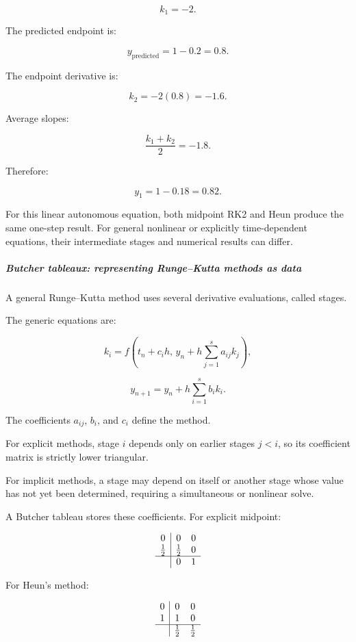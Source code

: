 \[
k_1=-2.
\]

The predicted endpoint is:

\[
y_{\mathrm{predicted}}=1-0.2=0.8.
\]

The endpoint derivative is:

\[
k_2=-2(0.8)=-1.6.
\]

Average slopes:

\[
\frac{k_1+k_2}{2}=-1.8.
\]

Therefore:

\[
y_1=1-0.18=\boxed{0.82}.
\]

For this linear autonomous equation, both midpoint RK2 and Heun produce the same one-step result. For general nonlinear or explicitly time-dependent equations, their intermediate stages and numerical results can differ.

\subparagraph{Butcher tableaux: representing Runge--Kutta methods as data}\label{02-foundations-ii-ch025-butcher-tableaux-representing-rungekutta-methods-as-data}

A general Runge--Kutta method uses several derivative evaluations, called stages.

The generic equations are:

\[
k_i= f\left( t_n+c_ih,\, y_n+h\sum_{j=1}^{s}a_{ij}k_j \right),
\]

\[
\boxed{ y_{n+1} = y_n+h\sum_{i=1}^{s}b_ik_i }.
\]

The coefficients \(a_{ij}\), \(b_i\), and \(c_i\) define the method.

For explicit methods, stage \(i\) depends only on earlier stages \(j<i\), so its coefficient matrix is strictly lower triangular.

For implicit methods, a stage may depend on itself or another stage whose value has not yet been determined, requiring a simultaneous or nonlinear solve.

A Butcher tableau stores these coefficients. For explicit midpoint:

\[
\begin{array}{c|cc} 0&0&0\\ \frac12&\frac12&0\\ \hline &0&1 \end{array}
\]

For Heun's method:

\[
\begin{array}{c|cc} 0&0&0\\ 1&1&0\\ \hline &\frac12&\frac12 \end{array}
\]

